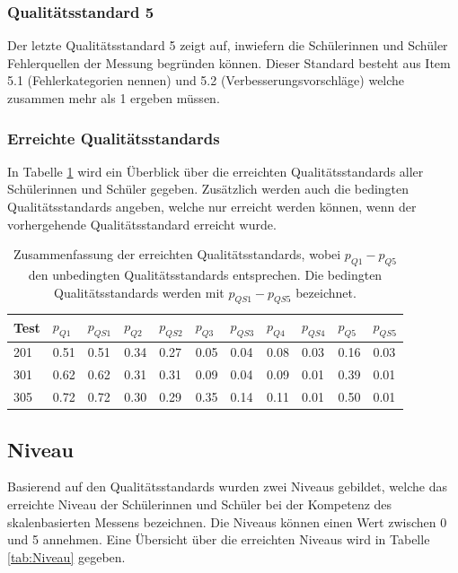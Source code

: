 \subsubsection*{Qualitätsstandard 5}
Der letzte Qualitätsstandard 5 zeigt auf, inwiefern die Schülerinnen und Schüler Fehlerquellen der Messung begründen können. Dieser Standard besteht aus Item 5.1 (Fehlerkategorien nennen) und 5.2 (Verbesserungsvorschläge) welche zusammen mehr als 1 ergeben müssen.

\subsubsection{Erreichte Qualitätsstandards}

In Tabelle \ref{tab:QS} wird ein Überblick über die erreichten Qualitätsstandards aller Schülerinnen und Schüler gegeben. Zusätzlich werden auch die bedingten Qualitätsstandards angeben, welche nur erreicht werden können, wenn der vorhergehende Qualitätsstandard erreicht wurde.


\begin{table}[!htbp]
  \centering
\begin{tabular}{@{}lllllllllll@{}}
\toprule
 Test & $p_{Q1}$ & $p_{QS1}$ & $p_{Q2}$ & $p_{QS2}$& $p_{Q3}$& $p_{QS3}$& $p_{Q4}$& $p_{QS4}$& $p_{Q5}$& $p_{QS5}$\\ 
\midrule
 201 &   0.51 & 0.51& 0.34 & 0.27 & 0.05 & 0.04 & 0.08 & 0.03 & 0.16 & 0.03 \\ 
 301 &   0.62 & 0.62& 0.31 & 0.31 & 0.09 & 0.04 & 0.09 & 0.01 & 0.39 & 0.01\\ 
 305 &   0.72 & 0.72& 0.30 & 0.29 & 0.35 & 0.14 & 0.11 & 0.01 & 0.50 & 0.01\\ 
\bottomrule
\end{tabular} 
  \caption{Zusammenfassung der erreichten Qualitätsstandards, wobei $p_{Q1} - p_{Q5}$ den unbedingten Qualitätsstandards entsprechen. Die bedingten Qualitätsstandards werden mit $p_{QS1} - p_{QS5}$ bezeichnet.}
  \label{tab:QS}
\end{table}




\subsection{Niveau}

Basierend auf den Qualitätsstandards wurden zwei Niveaus gebildet, welche das erreichte Niveau der Schülerinnen und Schüler bei der Kompetenz des skalenbasierten Messens bezeichnen. Die Niveaus können einen Wert zwischen 0 und 5 annehmen. Eine Übersicht über die erreichten Niveaus wird in Tabelle \ref{tab:Niveau} gegeben.

